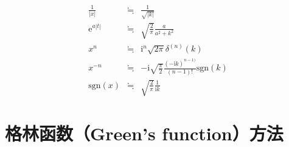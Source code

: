 \documentclass[12pt,a4paper]{article}
\renewcommand{\[}{\ $\displaystyle}
\renewcommand{\]}{$\ }%
\newcommand\mi{\mathrm{i}}
\newcommand\e{\mathrm{e}}
\begin{document}
\begin{enumerate}
\begin{eqnarray*}
	  		  \frac{1}{|x|} &\fallingdotseq & \frac{1}{\sqrt{|k|}} \\
	  		  \e^{a|t|} &\fallingdotseq & \sqrt{\frac{2}{\pi}}\frac{a}{a^2+k^2} \\
	  		  x^n &\fallingdotseq & \mi^n\sqrt{2\pi}\delta^{(n)}(k) \\
	  		  x^{-n} &\fallingdotseq & -\mi\sqrt{\frac{\pi}{2}}\frac{(-\mi k)^{n-1)}}{(n-1)!}\mathrm{sgn}(k)\\
	  		  \mathrm{sgn}(x) &\fallingdotseq & \sqrt{\frac 2\pi}\frac{1}{\mi k}
	  		\end{eqnarray*}
	  \end{enumerate}
	
\section{格林函数（Green's function）方法}
\end{document}
